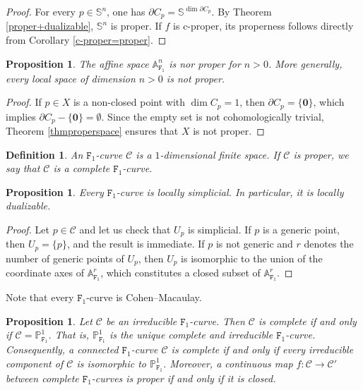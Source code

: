 \documentclass[amssymb,amscd,11pt,20pt]{amsart}
\newcommand{\FF}{{\mathtt F}}
\newcommand{\PP}{\mathbb P}
\newcommand{\AAA}{\mathbb A}
\newcommand{\0}{\mathbf 0}
\newcommand{\C}{{\mathcal C}}
\newcommand{\A}{{\mathbb A}}
\theoremstyle{plain}
\newtheorem{prop}[thm]{Proposition}
\newtheorem{defn}[thm]{Definition}
\numberwithin{equation}{thm}
\begin{document}
\begin{proof} For every $p\in {\mathbb S}^n$, one has $\partial C_p= {\mathbb S}^{\dim \partial C_p}$. By Theorem \ref{proper+dualizable}, ${\mathbb S}^n$ is proper. If $f$ is c-proper,   its properness follows directly from Corollary \ref{c-proper=proper}.

\end{proof}

\begin{prop} The affine space $\AAA^n_{\FF_1}$ is nor proper  for $n>0$. More generally, every local  space of dimension $n>0$ is not proper.
\end{prop}

\begin{proof} If $p\in X$ is a non-closed point with $\dim C_p=1$, then $\partial C_p=\{\0\}$,  which implies  $\partial C_p-\{\0\}=\emptyset$. Since the empty set is not cohomologically trivial,  Theorem \ref{thmproperspace}   ensures that  $X$ is not proper.
\end{proof}

\medskip
\noindent{\S\it \ \ Complete curves over $\FF_1$.}\medskip

\begin{defn}{\rm  An {\em $\FF_1$-curve} $\C$ is   a  $1$-dimensional finite space. If $\C$ is proper, we say that $\C$ is a {\em complete} $\FF_1$-curve.}
\end{defn}

\begin{prop} Every $\FF_1$-curve is locally simplicial. In particular, it is locally dualizable.
\end{prop}

\begin{proof} Let $p\in \C$ and let us check that $U_p$ is simplicial. 
If $p$ is a generic point, then $U_p=\{p\}$, and the result is immediate. If $p$ is not generic and $r$ denotes  the number of generic points of $U_p$, then $U_p$ is isomorphic to the union of the coordinate axes   of $\A^r_{\FF_1}$, which constitutes  a closed subset of $\A^r_{\FF_1}$. 
\end{proof}

Note that every $\FF_1$-curve is Cohen--Macaulay.

\begin{prop}\label{completecurves} Let $\C$ be an irreducible $\FF_1$-curve. Then $\C$ is complete if and only if $\C=\PP^1_{\FF_1}$. That is, $\PP_{\FF_1}^1$ is the unique complete and irreducible $\FF_1$-curve. Consequently, a connected $\FF_1$-curve $\C$ is complete if and only if every irreducible component of $\C$ is isomorphic to $\PP^1_{\FF_1}$. Moreover, a continuous map $f\colon \C\to \C'$ between complete  $\FF_1$-curves is proper if and only if it is closed.
\end{prop}
\end{document}
